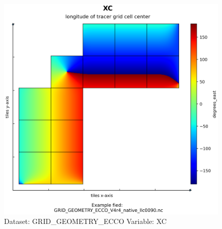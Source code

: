 \begin{figure}[H]
\centering
\includegraphics[scale=0.55]{../images/plots/native_plots_coords/Geometry_Parameters_for_the_Lat-Lon-Cap_90_(llc90)_Native_Model_Grid_(Version_4_Release_4)/XC.png}
\caption{Dataset: GRID\_GEOMETRY\_ECCO Variable: XC}
\label{tab:table-GRID_GEOMETRY_ECCO_XC-Plot}
\end{figure}
\pagebreak
